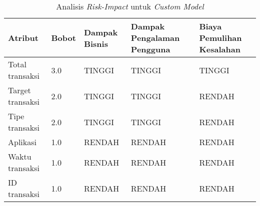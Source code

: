 \begin{table}[h!]
    \centering
    \caption{Analisis \emph{Risk-Impact} untuk \emph{Custom Model}}
    \label{tab:risk-impact-custom-model}
    \begin{tabularx}{\textwidth}{|p{3cm}|p{1cm}|p{2cm}|p{2.5cm}|X|}
        \hline
        \textbf{Atribut} & \textbf{Bobot} & \textbf{Dampak Bisnis} & \textbf{Dampak Pengalaman Pengguna} & \textbf{Biaya Pemulihan Kesalahan} \\ \hline
        Total transaksi & 3.0 & TINGGI & TINGGI & TINGGI \\ \hline
        Target transaksi & 2.0 & TINGGI & TINGGI & RENDAH \\ \hline
        Tipe transaksi & 2.0 & TINGGI & TINGGI & RENDAH \\ \hline
        Aplikasi & 1.0 & RENDAH & RENDAH & RENDAH \\ \hline
        Waktu transaksi & 1.0 & RENDAH & RENDAH & RENDAH \\ \hline
        ID transaksi & 1.0 & RENDAH & RENDAH & RENDAH \\ \hline
    \end{tabularx}
\end{table}




